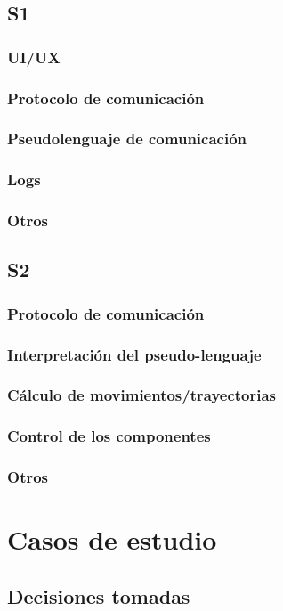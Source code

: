 \section{S1}
\subsection{UI/UX}
\subsection{Protocolo de comunicación}
\subsection{Pseudolenguaje de comunicación}
\subsection{Logs}
\subsection{Otros}
\section{S2}
\subsection{Protocolo de comunicación}
\subsection{Interpretación del pseudo-lenguaje}
\subsection{Cálculo de movimientos/trayectorias}
\subsection{Control de los componentes}
\subsection{Otros}
\chapter{Casos de estudio} %
\section{Decisiones tomadas}
